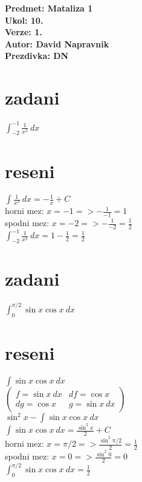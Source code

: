 \documentclass[a4paper]{article}
\def\doubleunderline#1{\underline{\underline{#1}}}
\begin{document}
\noindent
\textbf{Predmet: Mataliza 1}\\
\textbf{Ukol: 10.}\\
\textbf{Verze: 1.}\\
\textbf{Autor: David Napravnik}\\
\textbf{Prezdivka: DN}


\section*{zadani}
$\int_{-2}^{-1} \frac{1}{x^2}~dx$

\section*{reseni}
$\int \frac{1}{x^2}~dx = -\frac{1}{x} + C$\\
horni mez: $ x=-1 => -\frac{1}{-1} = 1$\\
spodni mez: $x=-2 => -\frac{1}{-2} = \frac{1}{2}$\\
\doubleunderline{$\int_{-2}^{-1} \frac{1}{x^2}~dx = 1-\frac{1}{2} = \frac{1}{2}$}











\section*{zadani}
$\int_{0}^{\pi / 2} \sin x \cos x~dx$

\section*{reseni}
$\int \sin x \cos x~dx$\\
$\left(
	\begin{matrix}
		f=\sin x~dx & df=\cos x\\
		dg=\cos x & g=\sin x~dx
	\end{matrix}
\right)$\\
$\sin^2 x - \int \sin x \cos x ~dx$\\
$\int \sin x \cos x~dx = \frac{\sin^2 x}{2} + C$\\
horni mez: $x=\pi / 2 => \frac{\sin^2 \pi / 2}{2} = \frac{1}{2}$\\
spodni mez: $ x=0 => \frac{\sin^2 0}{2} = 0$\\
\doubleunderline{$\int_{0}^{\pi / 2} \sin x \cos x~dx = \frac{1}{2}$}
\end{document}

